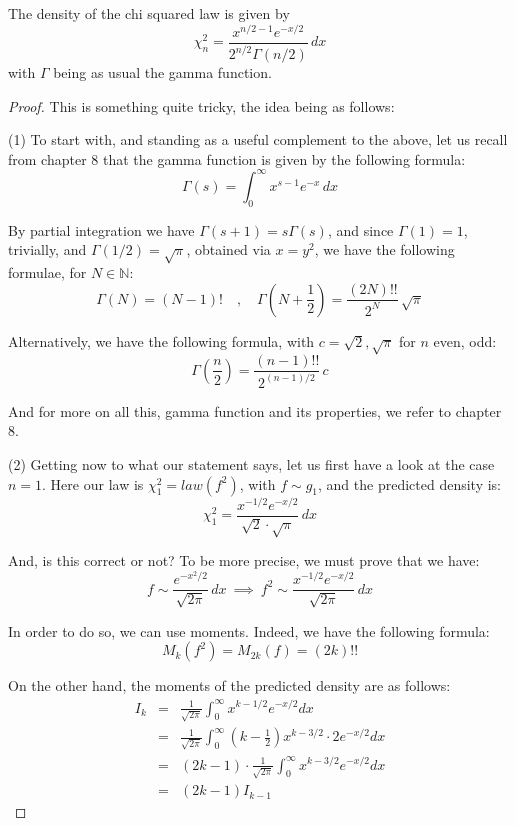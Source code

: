 \documentclass[10pt,a4paper]{amsart}
\begin{document}
\begin{theorem}
The density of the chi squared law is given by
$$\chi_n^2=\frac{x^{n/2-1}e^{-x/2}}{2^{n/2}\Gamma(n/2)}\,dx$$
with $\Gamma$ being as usual the gamma function.
\end{theorem}

\begin{proof}
This is something quite tricky, the idea being as follows:

\medskip

(1) To start with, and standing as a useful complement to the above, let us recall from chapter 8 that the gamma function is given by the following formula:
$$\Gamma(s)=\int_0^\infty x^{s-1}e^{-x}\,dx$$

By partial integration we have $\Gamma(s+1)=s\Gamma(s)$, and since $\Gamma(1)=1$, trivially, and $\Gamma(1/2)=\sqrt{\pi}$, obtained via $x=y^2$, we have the following formulae, for $N\in\mathbb N$:
$$\Gamma(N)=(N-1)!\quad,\quad\Gamma\left(N+\frac{1}{2}\right)=\frac{(2N)!!}{2^N}\,\sqrt{\pi}$$

Alternatively, we have the following formula, with $c=\sqrt{2},\sqrt{\pi}$ for $n$ even, odd:
$$\Gamma\left(\frac{n}{2}\right)=\frac{(n-1)!!}{2^{(n-1)/2}}\,c$$

And for more on all this, gamma function and its properties, we refer to chapter 8.

\medskip

(2) Getting now to what our statement says, let us first have a look at the case $n=1$. Here our law is $\chi_1^2=law(f^2)$, with $f\sim g_1$, and the predicted density is:
$$\chi_1^2=\frac{x^{-1/2}e^{-x/2}}{\sqrt{2}\cdot\sqrt{\pi}}\,dx$$

And, is this correct or not? To be more precise, we must prove that we have:
$$f\sim\frac{e^{-x^2/2}}{\sqrt{2\pi}}\,dx\ \implies\ f^2\sim\frac{x^{-1/2}e^{-x/2}}{\sqrt{2\pi}}\,dx$$

In order to do so, we can use moments. Indeed, we have the following formula:
$$M_k(f^2)=M_{2k}(f)=(2k)!!$$

On the other hand, the moments of the predicted density are as follows:
\begin{eqnarray*}
I_k
&=&\frac{1}{\sqrt{2\pi}}\int_0^\infty x^{k-1/2}e^{-x/2}dx\\
&=&\frac{1}{\sqrt{2\pi}}\int_0^\infty\left(k-\frac{1}{2}\right)x^{k-3/2}\cdot 2e^{-x/2}dx\\
&=&(2k-1)\cdot\frac{1}{\sqrt{2\pi}}\int_0^\infty x^{k-3/2}e^{-x/2}dx\\
&=&(2k-1)I_{k-1}
\end{eqnarray*}


\end{proof}
\end{document}
